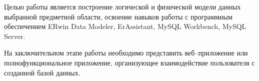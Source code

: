 \Introduction

Целью работы является построение логической и физической модели данных выбранной предметной области, освоение навыков работы с программным обеспечением ERwin Data Modeler, ErAssistant, MySQL Workbench, MySQL Server. 

На заключительном этапе работы необходимо представить веб--приложение или полнофункциональное приложение, организующее взаимодействие пользователя с созданной базой данных.  

%

